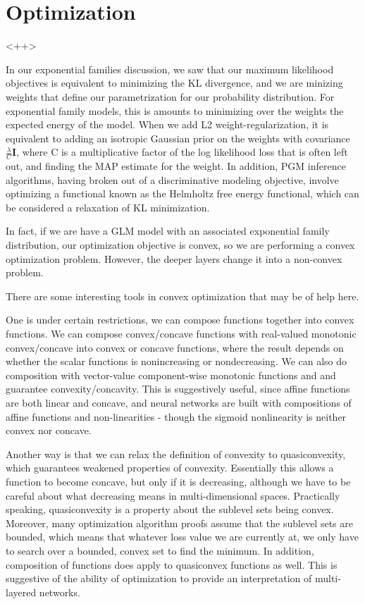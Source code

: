 \documentclass[a4paper]{article}
\begin{document}
\section{Optimization}<++>

In our exponential families discussion, we saw that our maximum likelihood objectives is equivalent to minimizing the KL divergence, and we are minizing weights that define our parametrization for our probability distribution.
For exponential family models, this is amounts to minimizing over the weights the expected energy of the model. 
When we add L2 weight-regularization, it is equivalent to adding an isotropic Gaussian prior on the weights with covariance $\frac{\lambda}{C} \mathbf{I}$, where C is a multiplicative factor of the log likelihood loss that is often left out, and finding the MAP estimate for the weight. 
In addition, PGM inference algorithms, having broken out of a discriminative modeling objective, involve optimizing a functional known as the Helmholtz free energy functional, which can be considered a relaxation of KL minimization.

In fact, if we are have a GLM model with an associated exponential family distribution, our optimization objective is convex, so we are performing a convex optimization problem. 
However, the deeper layers change it into a non-convex problem. 

There are some interesting tools in convex optimization that may be of help here. 

One is under certain restrictions, we can compose functions together into convex functions. 
We can compose convex/concave functions with real-valued monotonic convex/concave into convex or concave functions, where the result depends on whether the scalar functions is nonincreasing or nondecreasing. 
We can also do composition with vector-value component-wise monotonic functions and and guarantee convexity/concavity. 
This is suggestively useful, since affine functions are both linear and concave, and neural networks are built with compositions of affine functions and non-linearities - though the sigmoid nonlinearity is neither convex nor concave.

Another way is that we can relax the definition of convexity to quasiconvexity, which guarantees weakened properties of convexity. 
Essentially this allows a function to become concave, but only if it is decreasing, although we have to be careful about what decreasing means in multi-dimensional spaces. 
Practically speaking, quasiconvexity is a property about the sublevel sets being convex. 
Moreover, many optimization algorithm proofs assume that the sublevel sets are bounded, which means that whatever loss value we are currently at, we only have to search over a bounded, convex set to find the minimum.
In addition, composition of functions does apply to quasiconvex functions as well. This is suggestive of the ability of optimization to provide an interpretation of multi-layered networks. 
\end{document}
